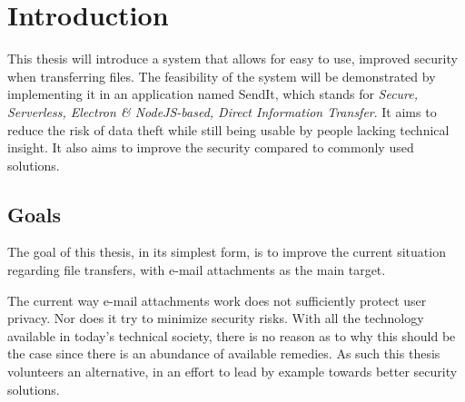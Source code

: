 








\chapter{Introduction} %
%
\label{Chapter1} %
%
\newcommand{\keyword}[1]{\textbf{#1}}
\newcommand{\tabhead}[1]{\textbf{#1}}
\newcommand{\code}[1]{\texttt{#1}}
\newcommand{\file}[1]{\texttt{\bfseries#1}}
\newcommand{\option}[1]{\texttt{\itshape#1}}

This thesis will introduce a system that allows for easy to use, improved security when transferring files. The feasibility of the system will be demonstrated by implementing it in an application named SendIt, which stands for \emph{Secure, Serverless, Electron \& NodeJS-based, Direct Information Transfer}. It aims to reduce the risk of data theft while still being usable by people lacking technical insight. It also aims to improve the security compared to commonly used solutions. 
%
\section{Goals}
%
The goal of this thesis, in its simplest form, is to improve the current situation regarding file transfers, with e-mail attachments as the main target.

The current way e-mail attachments work does not sufficiently protect user privacy. Nor does it try to minimize security risks. With all the technology available in today's technical society, there is no reason as to why this should be the case since there is an abundance of available remedies. As such this thesis volunteers an alternative, in an effort to lead by example towards better security solutions.

